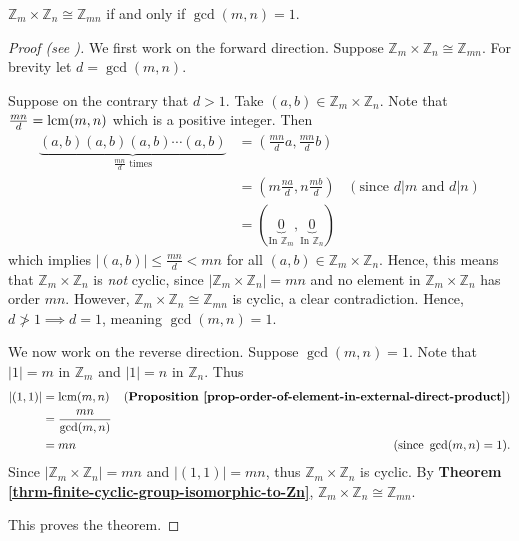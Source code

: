 \begin{theorem}\label{thrm-Zm-cross-Zn-isomorphic-to-Zmn-condition}
    $\mathbb{Z}_m \times \mathbb{Z}_n \cong \mathbb{Z}_{mn}$ if and only if $\gcd(m,n) = 1$.
\end{theorem}
\begin{proof}[Proof (see {\cite[Proposition 13.1 (3)]{humphreys_1996}})]
    We first work on the forward direction. Suppose $\mathbb{Z}_m \times \mathbb{Z}_n \cong \mathbb{Z}_{mn}$. For brevity let $d = \gcd(m,n)$.
    
    Suppose on the contrary that $d > 1$. Take $(a, b) \in \mathbb{Z}_m \times \mathbb{Z}_n$. Note that $\frac{mn}{d} = \mathrm{lcm}(m,n)$ which is a positive integer. Then
    \begin{align*}
        \underbrace{(a,b)(a,b)(a,b)\cdots(a,b)}_{\frac{mn}{d}\text{ times}} &= \left(\frac{mn}{d}a, \frac{mn}{d}b\right)\\
        &= \left(m\frac{na}{d}, n\frac{mb}{d}\right) & (\text{since } d | m \text{ and } d | n)\\
        &= (\underbrace{0}_{\text{In } \mathbb{Z}_m}, \underbrace{0}_{\text{In } \mathbb{Z}_n})
    \end{align*}
    which implies $|(a, b)| \leq \frac{mn}{d} < mn$ for all $(a, b) \in \mathbb{Z}_m \times \mathbb{Z}_n$. Hence, this means that $\mathbb{Z}_m \times \mathbb{Z}_n$ is \textit{not} cyclic, since $|\mathbb{Z}_m \times \mathbb{Z}_n| = mn$ and no element in $\mathbb{Z}_m \times \mathbb{Z}_n$ has order $mn$. However, $\mathbb{Z}_m \times \mathbb{Z}_n \cong \mathbb{Z}_{mn}$ is cyclic, a clear contradiction. Hence, $d \not>1 \implies d = 1$, meaning $\gcd(m,n) = 1$.

    We now work on the reverse direction. Suppose $\gcd(m,n) = 1$. Note that $|1| = m$ in $\mathbb{Z}_m$ and $|1| = n$ in $\mathbb{Z}_n$. Thus
    \begin{align*}
        |(1, 1)| &= \mathrm{lcm}(m, n) & (\text{\textbf{Proposition \ref{prop-order-of-element-in-external-direct-product}}})\\
        &= \frac{mn}{\gcd(m,n)}\\
        &= mn & (\text{since }\gcd(m,n) = 1).
    \end{align*}
    Since $|\mathbb{Z}_m \times \mathbb{Z}_n| = mn$ and $|(1,1)| = mn$, thus $\mathbb{Z}_m \times \mathbb{Z}_n$ is cyclic. By \textbf{Theorem \ref{thrm-finite-cyclic-group-isomorphic-to-Zn}}, $\mathbb{Z}_m \times \mathbb{Z}_n \cong \mathbb{Z}_{mn}$.

    This proves the theorem.
\end{proof}

